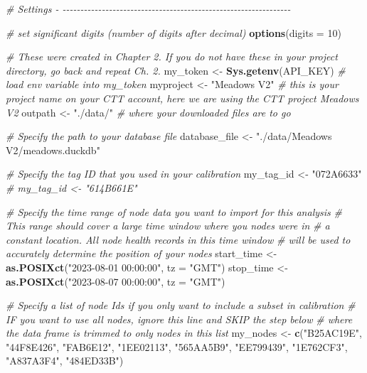 \documentclass[
]{book}
\newenvironment{Shaded}{\begin{snugshade}}{\end{snugshade}}
\newcommand{\AttributeTok}[1]{\textcolor[rgb]{0.13,0.29,0.53}{#1}}
\newcommand{\CommentTok}[1]{\textcolor[rgb]{0.56,0.35,0.01}{\textit{#1}}}
\newcommand{\DecValTok}[1]{\textcolor[rgb]{0.00,0.00,0.81}{#1}}
\newcommand{\FunctionTok}[1]{\textcolor[rgb]{0.13,0.29,0.53}{\textbf{#1}}}
\newcommand{\NormalTok}[1]{#1}
\newcommand{\OtherTok}[1]{\textcolor[rgb]{0.56,0.35,0.01}{#1}}
\newcommand{\StringTok}[1]{\textcolor[rgb]{0.31,0.60,0.02}{#1}}
\begin{document}
\begin{Shaded}
\begin{Highlighting}[]
\CommentTok{\# Settings {-} {-}{-}{-}{-}{-}{-}{-}{-}{-}{-}{-}{-}{-}{-}{-}{-}{-}{-}{-}{-}{-}{-}{-}{-}{-}{-}{-}{-}{-}{-}{-}{-}{-}{-}{-}{-}{-}{-}{-}{-}{-}{-}{-}{-}{-}{-}{-}{-}{-}{-}{-}{-}{-}{-}{-}{-}{-}{-}{-}{-}{-}{-}{-}{-}}

\CommentTok{\# set significant digits (number of digits after decimal)}
\FunctionTok{options}\NormalTok{(}\AttributeTok{digits =} \DecValTok{10}\NormalTok{)}

\CommentTok{\# These were created in Chapter 2. If you do not have these in your project directory, go back and repeat Ch. 2.}
\NormalTok{my\_token }\OtherTok{\textless{}{-}} \FunctionTok{Sys.getenv}\NormalTok{(}\StringTok{\textquotesingle{}API\_KEY\textquotesingle{}}\NormalTok{) }\CommentTok{\# load env variable into my\_token}
\NormalTok{myproject }\OtherTok{\textless{}{-}} \StringTok{"Meadows V2"} \CommentTok{\# this is your project name on your CTT account, here we are using the CTT project \textquotesingle{}Meadows V2\textquotesingle{}}
\NormalTok{outpath }\OtherTok{\textless{}{-}} \StringTok{"./data/"} \CommentTok{\# where your downloaded files are to go}

\CommentTok{\# Specify the path to your database file}
\NormalTok{database\_file }\OtherTok{\textless{}{-}} \StringTok{"./data/Meadows V2/meadows.duckdb"}

\CommentTok{\# Specify the tag ID that you used in your calibration}
\NormalTok{my\_tag\_id }\OtherTok{\textless{}{-}} \StringTok{"072A6633"}
\CommentTok{\# my\_tag\_id \textless{}{-} "614B661E"}

\CommentTok{\# Specify the time range of node data you want to import for this analysis}
\CommentTok{\#   This range should cover a large time window where you nodes were in}
\CommentTok{\#   a constant location.  All node health records in this time window}
\CommentTok{\#   will be used to accurately determine the position of your nodes}
\NormalTok{start\_time }\OtherTok{\textless{}{-}} \FunctionTok{as.POSIXct}\NormalTok{(}\StringTok{"2023{-}08{-}01 00:00:00"}\NormalTok{, }\AttributeTok{tz =} \StringTok{"GMT"}\NormalTok{)}
\NormalTok{stop\_time }\OtherTok{\textless{}{-}} \FunctionTok{as.POSIXct}\NormalTok{(}\StringTok{"2023{-}08{-}07 00:00:00"}\NormalTok{, }\AttributeTok{tz =} \StringTok{"GMT"}\NormalTok{)}

\CommentTok{\# Specify a list of node Ids if you only want to include a subset in calibration}
\CommentTok{\# IF you want to use all nodes, ignore this line and SKIP the step below}
\CommentTok{\# where the data frame is trimmed to only nodes in this list}
\NormalTok{my\_nodes }\OtherTok{\textless{}{-}} \FunctionTok{c}\NormalTok{(}\StringTok{"B25AC19E"}\NormalTok{, }\StringTok{"44F8E426"}\NormalTok{, }\StringTok{"FAB6E12"}\NormalTok{, }\StringTok{"1EE02113"}\NormalTok{, }\StringTok{"565AA5B9"}\NormalTok{, }\StringTok{"EE799439"}\NormalTok{, }\StringTok{"1E762CF3"}\NormalTok{, }\StringTok{"A837A3F4"}\NormalTok{, }\StringTok{"484ED33B"}\NormalTok{)}


\end{Highlighting}
\end{Shaded}
\end{document}
